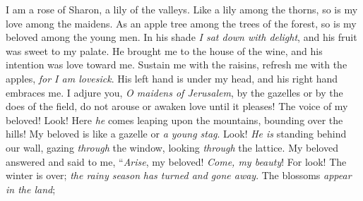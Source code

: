\begin{biblechapter} %
 I am a rose of Sharon, 
a lily of the valleys.
\verse Like a lily among the thorns, 
so is my love among the maidens.
\verse As an apple tree among the trees of the forest, 
so is my beloved among the young men. 
In his shade \textit{I sat down with delight}, 
and his fruit was sweet to my palate.
 He brought me to the house of the wine, 
and his intention was love toward me.
\verse Sustain me with the raisins, 
refresh me with the apples, 
\textit{for I am lovesick}.
 His left hand is under my head, 
and his right hand embraces me.
\verse I adjure you, \textit{O maidens of Jerusalem}, 
by the gazelles or by the does of the field, 
do not arouse or awaken love until it pleases!
 The voice of my beloved! 
Look! Here \textit{he} comes leaping upon the mountains, 
bounding over the hills!
\verse My beloved is like a gazelle or \textit{a young stag}. 
Look! \textit{He is} standing behind our wall, 
gazing \textit{through} the window, 
looking \textit{through} the lattice.
\verse My beloved answered and said to me, 
“\textit{Arise}, my beloved! \textit{Come, my beauty}!
\verse For look! The winter is over; 
\textit{the rainy season} \textit{has turned and gone away}.
\verse The blossoms \textit{appear} \textit{in the land}; 

\end{biblechapter}
